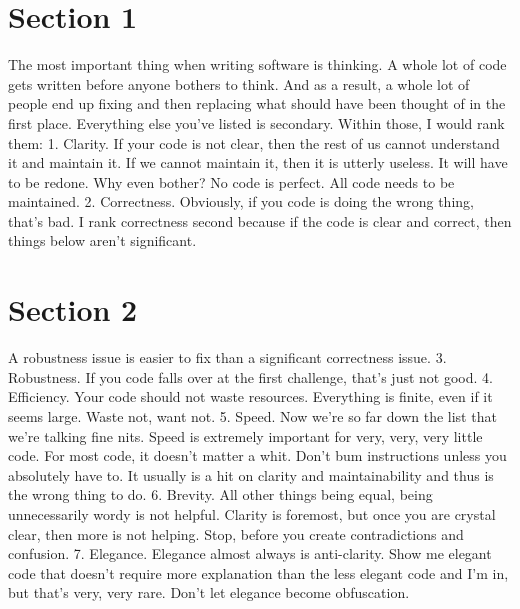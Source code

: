 \documentclass[a4]{article}
\begin{document}
\section*{Section 1}

The most important thing when writing software is thinking. A whole lot of code gets written before anyone bothers to think. And as a result, a whole lot of people end up fixing and then replacing what should have been thought of in the first place. Everything else you've listed is secondary. Within those, I would rank them: 1. Clarity. If your code is not clear, then the rest of us cannot understand it and maintain it. If we cannot maintain it, then it is utterly useless. It will have to be redone. Why even bother? No code is perfect. All code needs to be maintained. 2. Correctness. Obviously, if you code is doing the wrong thing, that's bad. I rank correctness second because if the code is clear and correct, then things below aren't significant.
\section*{Section 2}

 A robustness issue is easier to fix than a significant correctness issue. 3. Robustness. If you code falls over at the first challenge, that's just not good. 4. Efficiency. Your code should not waste resources. Everything is finite, even if it seems large. Waste not, want not. 5. Speed. Now we're so far down the list that we're talking fine nits. Speed is extremely important for very, very, very little code. For most code, it doesn't matter a whit. Don't bum instructions unless you absolutely have to. It usually is a hit on clarity and maintainability and thus is the wrong thing to do. 6. Brevity. All other things being equal, being unnecessarily wordy is not helpful. Clarity is foremost, but once you are crystal clear, then more is not helping. Stop, before you create contradictions and confusion. 7. Elegance. Elegance almost always is anti-clarity. Show me elegant code that doesn't require more explanation than the less elegant code and I'm in, but that's very, very rare. Don't let elegance become obfuscation.
 
\end{document}
